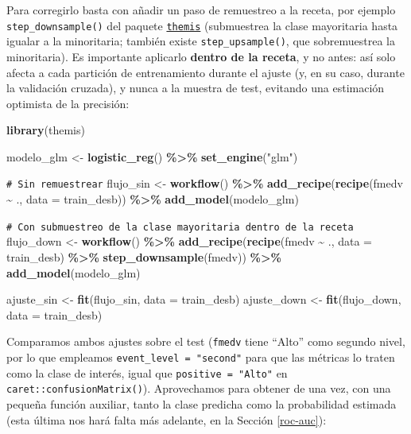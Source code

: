 \documentclass[
]{book}
\newenvironment{Shaded}{\begin{snugshade}}{\end{snugshade}}
\newcommand{\AttributeTok}[1]{\textcolor[rgb]{0.13,0.29,0.53}{#1}}
\newcommand{\CommentTok}[1]{\textcolor[rgb]{0.56,0.35,0.01}{\textit{#1}}}
\newcommand{\FunctionTok}[1]{\textcolor[rgb]{0.13,0.29,0.53}{\textbf{#1}}}
\newcommand{\NormalTok}[1]{#1}
\newcommand{\OtherTok}[1]{\textcolor[rgb]{0.56,0.35,0.01}{#1}}
\newcommand{\SpecialCharTok}[1]{\textcolor[rgb]{0.81,0.36,0.00}{\textbf{#1}}}
\newcommand{\StringTok}[1]{\textcolor[rgb]{0.31,0.60,0.02}{#1}}
\theoremstyle{break}
\theoremstyle{nonumberplain}
\renewcommand{\CommentTok}[1]{\textcolor[rgb]{0.41,0.41,0.41}{\texttt{#1}}}
\begin{document}
Para corregirlo basta con añadir un paso de remuestreo a la receta, por ejemplo \texttt{step\_downsample()} del paquete \href{https://themis.tidymodels.org}{\texttt{themis}} (submuestrea la clase mayoritaria hasta igualar a la minoritaria; también existe \texttt{step\_upsample()}, que sobremuestrea la minoritaria). Es importante aplicarlo \textbf{dentro de la receta}, y no antes: así solo afecta a cada partición de entrenamiento durante el ajuste (y, en su caso, durante la validación cruzada), y nunca a la muestra de test, evitando una estimación optimista de la precisión:

\begin{Shaded}
\begin{Highlighting}[]
\FunctionTok{library}\NormalTok{(themis)}

\NormalTok{modelo\_glm }\OtherTok{\textless{}{-}} \FunctionTok{logistic\_reg}\NormalTok{() }\SpecialCharTok{\%\textgreater{}\%}
  \FunctionTok{set\_engine}\NormalTok{(}\StringTok{"glm"}\NormalTok{)}

\CommentTok{\# Sin remuestrear}
\NormalTok{flujo\_sin }\OtherTok{\textless{}{-}} \FunctionTok{workflow}\NormalTok{() }\SpecialCharTok{\%\textgreater{}\%}
  \FunctionTok{add\_recipe}\NormalTok{(}\FunctionTok{recipe}\NormalTok{(fmedv }\SpecialCharTok{\textasciitilde{}}\NormalTok{ ., }\AttributeTok{data =}\NormalTok{ train\_desb)) }\SpecialCharTok{\%\textgreater{}\%}
  \FunctionTok{add\_model}\NormalTok{(modelo\_glm)}

\CommentTok{\# Con submuestreo de la clase mayoritaria dentro de la receta}
\NormalTok{flujo\_down }\OtherTok{\textless{}{-}} \FunctionTok{workflow}\NormalTok{() }\SpecialCharTok{\%\textgreater{}\%}
  \FunctionTok{add\_recipe}\NormalTok{(}\FunctionTok{recipe}\NormalTok{(fmedv }\SpecialCharTok{\textasciitilde{}}\NormalTok{ ., }\AttributeTok{data =}\NormalTok{ train\_desb) }\SpecialCharTok{\%\textgreater{}\%}
               \FunctionTok{step\_downsample}\NormalTok{(fmedv)) }\SpecialCharTok{\%\textgreater{}\%}
  \FunctionTok{add\_model}\NormalTok{(modelo\_glm)}

\NormalTok{ajuste\_sin }\OtherTok{\textless{}{-}} \FunctionTok{fit}\NormalTok{(flujo\_sin, }\AttributeTok{data =}\NormalTok{ train\_desb)}
\NormalTok{ajuste\_down }\OtherTok{\textless{}{-}} \FunctionTok{fit}\NormalTok{(flujo\_down, }\AttributeTok{data =}\NormalTok{ train\_desb)}
\end{Highlighting}
\end{Shaded}

Comparamos ambos ajustes sobre el test (\texttt{fmedv} tiene ``Alto'' como segundo nivel, por lo que empleamos \texttt{event\_level\ =\ "second"} para que las métricas lo traten como la clase de interés, igual que \texttt{positive\ =\ "Alto"} en \texttt{caret::confusionMatrix()}). Aprovechamos para obtener de una vez, con una pequeña función auxiliar, tanto la clase predicha como la probabilidad estimada (esta última nos hará falta más adelante, en la Sección \ref{roc-auc}):
\end{document}
